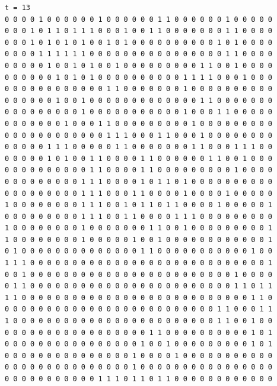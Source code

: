 \documentclass[a4paper,12pt]{article}
\begin{document}
\begin{verbatim}
t = 13
0 0 0 0 1 0 0 0 0 0 0 1 0 0 0 0 0 0 1 1 0 0 0 0 0 0 1 0 0 0 0 0 
0 0 0 1 0 1 1 0 1 1 1 0 0 0 1 0 0 1 1 0 0 0 0 0 0 0 1 1 0 0 0 0 
0 0 0 1 0 1 0 1 0 1 0 0 1 0 1 0 0 0 0 0 0 0 0 0 0 1 0 1 0 0 0 0 
0 0 0 0 1 1 1 1 1 1 0 0 0 0 0 0 0 0 0 0 0 0 0 0 0 0 1 1 0 0 0 0 
0 0 0 0 0 1 0 0 1 0 1 0 0 1 0 0 0 0 0 0 0 0 0 1 1 0 0 1 0 0 0 0 
0 0 0 0 0 0 1 0 1 0 1 0 0 0 0 0 0 0 0 0 0 1 1 1 1 0 0 0 1 0 0 0 
0 0 0 0 0 0 0 0 0 0 0 0 1 1 0 0 0 0 0 0 0 1 0 0 0 0 0 0 0 0 0 0 
0 0 0 0 0 0 1 0 0 1 0 0 0 0 0 0 0 0 0 0 0 0 0 1 1 0 0 0 0 0 0 0 
0 0 0 0 0 0 0 0 0 1 0 0 0 0 0 0 0 0 0 0 0 1 0 0 0 1 1 0 0 0 0 0 
0 0 0 0 0 0 0 1 0 0 0 1 1 0 0 0 0 0 0 0 0 0 1 0 0 0 0 0 0 0 0 0 
0 0 0 0 0 0 0 0 0 0 0 0 1 1 1 0 0 0 1 1 0 0 0 1 0 0 0 0 0 0 0 0 
0 0 0 0 0 1 1 1 0 0 0 0 0 1 1 0 0 0 0 0 0 0 1 1 0 0 0 1 1 1 0 0 
0 0 0 0 0 1 0 1 0 0 1 1 0 0 0 0 1 1 0 0 0 0 0 0 1 1 0 0 1 0 0 0 
0 0 0 0 0 0 0 0 0 0 1 1 0 0 0 0 1 1 0 0 0 0 0 0 0 0 0 1 0 0 0 0 
0 0 0 0 0 0 0 0 0 1 1 1 0 0 0 0 1 0 1 1 0 1 0 0 0 0 0 0 0 0 0 0 
0 0 0 0 0 0 0 0 0 1 1 1 0 0 0 1 1 0 0 0 0 1 0 0 0 0 1 0 0 0 0 0 
1 0 0 0 0 0 0 0 0 1 1 1 0 0 1 0 1 1 0 1 1 0 0 0 0 1 0 0 0 0 0 1 
0 0 0 0 0 0 0 0 0 1 1 1 0 0 1 1 0 0 0 0 1 1 1 0 0 0 0 0 0 0 0 0 
1 0 0 0 0 0 0 0 0 1 0 0 0 0 0 0 0 1 1 0 0 1 0 0 0 0 0 0 0 0 0 1 
1 0 0 0 0 0 0 0 0 1 0 0 0 0 0 1 0 0 1 0 0 0 0 0 0 0 0 0 0 0 0 1 
0 1 0 0 0 0 0 0 0 0 0 0 0 0 0 0 1 1 0 0 0 0 0 0 0 0 0 0 0 1 0 0 
1 1 1 0 0 0 0 0 0 0 0 0 0 0 0 0 0 0 0 0 0 0 0 0 0 0 0 0 0 0 0 1 
0 0 1 0 0 0 0 0 0 0 0 0 0 0 0 0 0 0 0 0 0 0 0 0 0 0 0 1 0 0 0 0 
0 1 1 0 0 0 0 0 0 0 0 0 0 0 0 0 0 0 0 0 0 0 0 0 0 0 0 1 1 0 1 1 
1 1 0 0 0 0 0 0 0 0 0 0 0 0 0 0 0 0 0 0 0 0 0 0 0 0 0 0 0 1 1 0 
0 0 0 0 0 0 0 0 0 0 0 0 0 0 0 0 0 0 0 0 0 0 0 0 0 1 1 0 0 0 1 1 
1 0 0 0 0 0 0 0 0 0 0 0 0 0 0 0 0 0 0 0 0 0 0 0 0 1 1 0 0 1 0 0 
0 0 0 0 0 0 0 0 0 0 0 0 0 0 0 0 0 1 1 0 0 0 0 0 0 0 0 0 0 1 0 1 
0 0 0 0 0 0 0 0 0 0 0 0 0 0 0 0 1 0 0 1 0 0 0 0 0 0 0 0 0 1 0 1 
0 0 0 0 0 0 0 0 0 0 0 0 0 0 0 1 0 0 0 0 1 0 0 0 0 0 0 0 0 0 0 0 
0 0 0 0 0 0 0 0 0 0 0 0 0 0 0 1 0 0 0 0 0 0 0 0 0 0 0 0 0 0 0 0 
0 0 0 0 0 0 0 0 0 0 0 1 1 1 0 1 1 0 1 1 0 0 0 0 0 0 0 0 0 0 0 0 




\end{verbatim}
\end{document}
